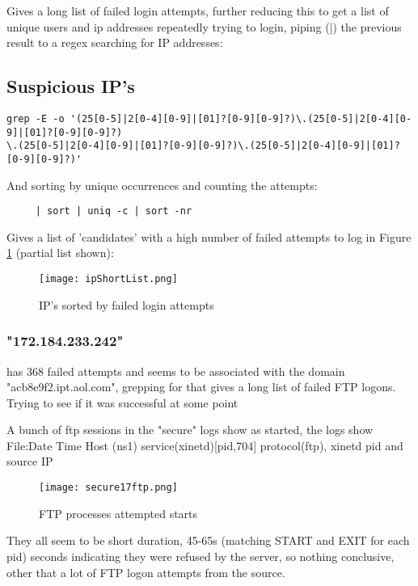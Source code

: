 \documentclass[
	letterpaper, %
	10pt, %
	unnumberedsections, %
	twoside, %
]{APAAssignment}
\begin{document}
Gives a long list of failed login attempts, further reducing this to get a list of unique users and ip addresses repeatedly trying to login,
piping (|) the previous result to a regex searching for IP addresses:
\subsection{Suspicious IP's}
\begin{verbatim}
grep -E -o '(25[0-5]|2[0-4][0-9]|[01]?[0-9][0-9]?)\.(25[0-5]|2[0-4][0-9]|[01]?[0-9][0-9]?)
\.(25[0-5]|2[0-4][0-9]|[01]?[0-9][0-9]?)\.(25[0-5]|2[0-4][0-9]|[01]?[0-9][0-9]?)'
\end{verbatim}

And sorting by unique occurrences and counting the attempts:

\begin{verbatim}
	 | sort | uniq -c | sort -nr
\end{verbatim}

Gives a list of 'candidates' with a high number of failed attempts to log in Figure \ref{fig:ipShortList} (partial list shown):

\begin{figure}[!htp] %
	\centering
	\texttt{[image: ipShortList.png]}
	\caption{IP's sorted by failed login attempts}
	\label{fig:ipShortList}
\end{figure}

\subsubsection{"172.184.233.242"}
has 368 failed attempts and seems to be associated with the domain "acb8e9f2.ipt.aol.com", grepping for that gives a long list of failed FTP logons. Trying to see if it was successful at some point

A bunch of ftp sessions in the "secure" logs show as started, the logs show File:Date Time Host (ns1) service(xinetd)[pid,704] protocol(ftp), xinetd pid and source IP
\begin{figure}[!htp] %
	\centering
	\texttt{[image: secure17ftp.png]}
	\caption{FTP processes attempted starts}
	\label{fig:secure17ftp}
\end{figure}

They all seem to be short duration, 45-65s (matching START and EXIT for each pid) seconds indicating they were refused by the server, so nothing conclusive, other that a lot of FTP logon attempts from the source.
\end{document}
